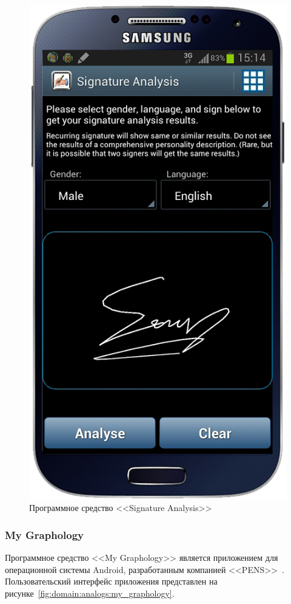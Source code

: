 \begin{figure}[ht]{}
    \centering
    \includegraphics[height=0.4\textheight]{figures/analog_signature_analysis.png}
    \caption{Программное средство <<Signature Analysis>>}
    \label{fig:domain:analogs:signature_analysis}
\end{figure}

\subsubsection{My Graphology}
\label{sub:domain:analogs:my_graphology}
Программное средство <<My Graphology>> является приложением для операционной системы Android, разработанным компанией <<PENS>>~\cite{analogs_my_graphology}. Пользовательский интерфейс приложения представлен на рисунке~\ref{fig:domain:analogs:my_graphology}.

